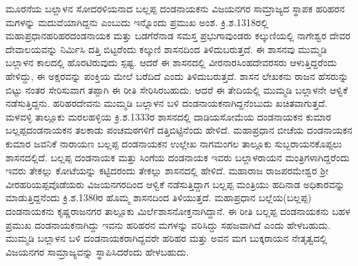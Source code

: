 ಮೂರನೆಯ ಬಲ್ಲಾಳನ ಸೋದರಳಿಯನಾದ ಬಲ್ಲಪ್ಪ ದಂಡನಾಯಕನು ವಿಜಯನಗರ ಸಾಮ್ರಾಜ್ಯದ ಸ್ಥಾಪಕ ಹರಿಹರನ ಮಗಳನ್ನು ಮದುವೆಯಾಗಿದ್ದನು ಎಂಬುದು ಇನ್ನೊಂದು ಪ್ರಮುಖ ಅಂಶ. ಕ್ರಿ.ಶ.1318ರಲ್ಲಿ ಮಹಾಪ್ರಧಾನ\break ಹರಿಹರದಂಡನಾಯಕ ಮತ್ತು ಬಡಗೆರೆನಾಡ ಸಮಸ್ತ ಪ್ರಭುಗಾವುಂಡರು ಕಲ್ಕುಣಿಯಲ್ಲಿ ನಾಗೇಶ್ವರ ದೇವರ ದೇವಾಲಯವನ್ನು ನಿರ್ಮಿಸಿ ದತ್ತಿ ಬಿಟ್ಟರೆಂದು ಕಲ್ಕುಣಿ ಶಾಸನದಿಂದ ತಿಳಿದುಬರುತ್ತದೆ. ಈ ಶಾಸನವು ಮುಮ್ಮಡಿ ಬಲ್ಲಾಳನ ಕಾಲದಲ್ಲಿ ಹೊರಟಿರುವುದು ಸ್ಪಷ್ಟ. ಆದರೆ ಈ ಶಾಸನದಲ್ಲಿ ವೀರನಾರಸಿಂಹದೇವರಸರು ಆಳುತ್ತಿದ್ದರೆಂದು ಹೇಳಿದ್ದು, ಈ ಅಕ್ಷರವನ್ನು ಪಂಕ್ತಿಯ ಮೇಲೆ ಬರೆದಿದೆ ಎಂದು ತಿಳಿದುಬರುತ್ತದೆ. ಶಾಸನ ಲೇಖಕನು ರಾಜನ ಹೆಸರುನ್ನು ಬಿಟ್ಟು ನಂತರ ಸೇರಿಸುವಾಗ ತಪ್ಪಾಗಿ ಈ ರೀತಿ ಸೇರಿಸಿರಬಹುದು. ಆದರೆ ಈ ತೇದಿಯಲ್ಲಿ ಮುಮ್ಮಡಿ ಬಲ್ಲಾಳನೇ ಆಳ್ವಿಕೆ ನಡೆಸುತ್ತಿದ್ದನು. ಹರಿಹರದೇವನು ಮುಮ್ಮಡಿ ಬಲ್ಲಾಳನ ಬಳಿ ದಂಡನಾಯಕನಾಗಿದ್ದನೆಂಬುದು ಖಚಿತವಾಗುತ್ತದೆ. ಮಳವಳ್ಳಿ ತಾಲ್ಲೂಕು ಮರಲಹಳ್ಳಿಯ ಕ್ರಿ.ಶ.1333ರ ಶಾಸನದಲ್ಲಿ ದಾಡಿಯಸೋಮೆಯ ದಂಡನಾಯಕನ ಕುಮಾರ ಬಲ್ಲಪ್ಪದಂಡನಾಯಕನ ತಲಕಾಡು ಪಂಚಮಠಗಳಿಗೆ ದತ್ತಿಬಿಟ್ಟಿ\-ನೆಂದು ಹೇಳಿದೆ. ಮಹಾಪ್ರಧಾನ ಬೀಚೆಯ ದಂಡನಾಯಕನ ಕುಮಾರ ಜವನಿಕೆ ನಾರಾಯಣ ಬಲ್ಲಪ್ಪ ದಂಡನಾಯಕನ ಉಲ್ಲೇಖ ನಾಗಮಂಗಲ ತಾಲ್ಲೂಕು ಸುಬ್ಬರಾಯನಕೊಪ್ಪಲು ಶಾಸನದಲ್ಲಿದೆ. ಬಲ್ಲಪ್ಪ ದಂಡನಾಯಕ ಮತ್ತು ಸಿಂಗೆಯ ದಂಡನಾಯಕ ಇವರು ಬಲ್ಲಾಳರಾಯನ ಮಂತ್ರಿಗಳಾಗಿದ್ದರೆಂದು ಇವರು ತೇಕಲ್ಲು ಕೋಟೆಯನ್ನು ಕಟ್ಟಿದರಂದು ತೇಕಲ್ಲು ಶಾಸನದಲ್ಲಿ ಹೇಳಿದೆ. ಮಹಾರಾಜ ರಾಜಪರಮೇಶ್ವರ ಶ‍್ರೀ ವೀರಹರಿಯಪ್ಪವೊಡೆಯರು ವಿಜಯನಗರದಿಂದ ಆಳ್ವಿಕೆ ನಡೆಸುತ್ತಿದ್ದಾಗ ಬಲ್ಲಪ್ಪ ಮಂತ್ರಿಯು ಹದಿನಾಡ ಅಧಿಕಾರವನ್ನು ಮಾಡುತ್ತಿದ್ದನೆಂದು ಕ್ರಿ.ಶ.1380ರ ಹೊಮ್ಮ ಶಾಸನದಿಂದ ತಿಳಿಯುತ್ತದೆ. ಮಹಾಪ್ರಧಾನ ಬಲ್ಲೆಯ(ಬಲ್ಲಪ್ಪ) ದಂಡನಾಯಕನು ಕೃಷ್ಣರಾಜನಗರ ತಾಲ್ಲೂಕು ಮಿರ್ಲೆಶಾಸನೋಕ್ತನಾಗಿ\-ದ್ದಾನೆ. ಈ ರೀತಿ ಬಲ್ಲಪ್ಪ ದಂಡನಾಯಕನು ಬಹಳ ಪ್ರಮುಖ ದಂಡನಾಯಕನಾಗಿದ್ದು ಇವನು ಹರಿಹರನ ಮಗಳನ್ನು ವರಿಸಿದ್ದು ಸಹಜವಾಗಿದೆ ಎಂದು ಹೇಳಬಹುದು. ಮುಮ್ಮಡಿ ಬಲ್ಲಾಳನ ಬಳಿ ದಂಡನಾಯಕರಾಗಿದ್ದವರೇ ಹರಿಹರ ಮತ್ತು ಅವನ ಮಗ ಬುಕ್ಕರಾಯನ ನೇತೃತ್ವದಲ್ಲಿ ವಿಜಯನಗರ ಸಾಮ್ರಾಜ್ಯವನ್ನು ಸ್ಥಾಪಿಸಿದರೆಂದು ಹೇಳಬಹುದು.

